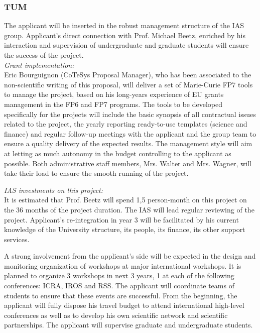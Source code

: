 \subsubsection{TUM}
The applicant will be inserted in the robust management structure of the IAS group. 
Applicant's direct connection with Prof. Michael Beetz, enriched by his interaction 
and supervision of undergraduate and graduate students  will ensure the success of the project. \\
\emph{Grant implementation:}\\
Eric Bourguignon  (CoTeSys Proposal Manager), who  has been associated
to the  non-scientific writing of  this proposal, will deliver  a
set of Marie-Curie FP7  tools to manage the  project, based on
his long-years experience  of EU grants management in  the FP6 and FP7
programs. The tools to be developed specifically for the projects will
include the  basic synopsis of  all contractual issues related  to the
project,  the  yearly reporting  ready-to-use  templates (science  and
finance) and regular follow-up meetings  with the applicant and the group 
team to ensure  a quality  delivery of  the expected  results.  The management
style will aim  at letting as much autonomy  in the budget controlling
to the applicant as possible. Both  administrative staff members, Mrs. Walter and
Mrs. Wagner, will take their load  to ensure the smooth running of the
project.

\emph{IAS investments on this project:}\\
It is estimated  that Prof. Beetz will spend  1,5 person-month on this
project on the 36 months of  the project duration. The IAS will lead
regular  reviewing of the  project. Applicant's re-integration
in  year  3  will  be  facilitated  by his  current  knowledge  of  the
University  structure,  its people,  its  finance,  its other  support
services.


A strong involvement from the applicant's side will be expected in the design
and  monitoring  organization   of  workshops at  major international
workshops. It is planned to organize 3 workshops in next 3 years, 1 at each of the
following conferences: ICRA, IROS and RSS. The applicant  will  coordinate  teams of
students  to  ensure  that  these  events are  successful.   From  the
beginning,  the applicant will fully  dispose his  travel budget  to attend
international  high-level conferences  as well  as to  develop  his own
scientific  network  and scientific  partnerships.   The applicant will  supervise
graduate and undergraduate students.

